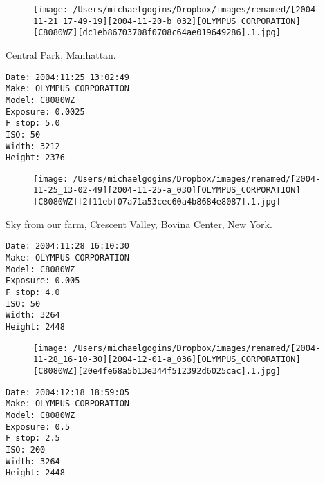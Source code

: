 \documentclass[11pt,letter,DIV=14,paper=landscape]{scrbook}
\begin{document}
\begin{figure}
\texttt{[image: /Users/michaelgogins/Dropbox/images/renamed/[2004-11-21\_17-49-19][2004-11-20-b\_032][OLYMPUS\_CORPORATION][C8080WZ][dc1eb86703708f0708c64ae019649286].1.jpg]}
\end{figure}
    
\clearpage
\noindent Central Park, Manhattan.
\noindent
\begin{lstlisting}
Date: 2004:11:25 13:02:49
Make: OLYMPUS CORPORATION
Model: C8080WZ
Exposure: 0.0025
F stop: 5.0
ISO: 50
Width: 3212
Height: 2376
\end{lstlisting}
\clearpage

\begin{figure}
\texttt{[image: /Users/michaelgogins/Dropbox/images/renamed/[2004-11-25\_13-02-49][2004-11-25-a\_030][OLYMPUS\_CORPORATION][C8080WZ][2f11ebf07a71a53cec60a4b8684e8087].1.jpg]}
\end{figure}
    
\clearpage
\noindent Sky from our farm, Crescent Valley, Bovina Center, New York.
\noindent
\begin{lstlisting}
Date: 2004:11:28 16:10:30
Make: OLYMPUS CORPORATION
Model: C8080WZ
Exposure: 0.005
F stop: 4.0
ISO: 50
Width: 3264
Height: 2448
\end{lstlisting}
\clearpage

\begin{figure}
\texttt{[image: /Users/michaelgogins/Dropbox/images/renamed/[2004-11-28\_16-10-30][2004-12-01-a\_036][OLYMPUS\_CORPORATION][C8080WZ][20e4fe68a5b13e344f512392d6025cac].1.jpg]}
\end{figure}
    
\clearpage
\noindent 
\noindent
\begin{lstlisting}
Date: 2004:12:18 18:59:05
Make: OLYMPUS CORPORATION
Model: C8080WZ
Exposure: 0.5
F stop: 2.5
ISO: 200
Width: 3264
Height: 2448
\end{lstlisting}
\clearpage
\end{document}
